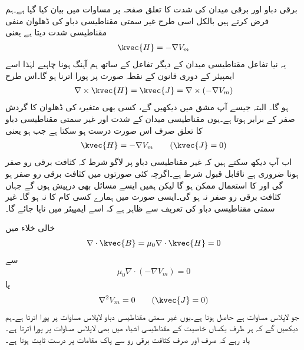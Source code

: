 برقی دباو اور برقی میدان کی شدت کا تعلق صفحہ  پر مساوات  میں بیان کیا گیا ہے۔ہم فرض کرتے ہیں  بالکل اسی طرح غیر سمتی مقناطیسی دباو  کی ڈھلوان منفی مقناطیسی شدت دیتا ہے یعنی
\begin{align*}
\kvec{H}=-\nabla V_m
\end{align*}
یہ نیا تفاعل مقناطیسی میدان کے دیگر تفاعل کے ساتھ ہم آہنگ ہونا چاہیے لہٰذا اسے ایمپیئر کے دوری قانون کے نقطہ صورت پر پورا اترنا ہو گا۔اس طرح
\begin{align}
\nabla \times \kvec{H}=\kvec{J}=\nabla \times \left(-\nabla V_m\right) 
\end{align}
ہو گا۔ البتہ جیسے آپ مشق  میں دیکھیں گے، کسی بھی متغیرہ کی ڈھلوان کا گردش صفر کے برابر ہوتا ہے۔یوں مقناطیسی میدان کے شدت اور غیر سمتی مقناطیسی دباو کا تعلق صرف اس صورت درست ہو سکتا ہے جب  ہو یعنی
\begin{align}\label{مساوات_مقناطیسی_شدت_غیر_سمتی_دباو}
\kvec{H}=-\nabla V_m \quad \quad (\kvec{J}=0)
\end{align}
اب آپ دیکھ سکتے ہیں کہ غیر مقناطیسی دباو پر لاگو شرط کہ کثافت برقی رو صفر ہونا ضروری ہے ناقابل قبول شرط ہے۔اگرچہ کئی صورتوں میں کثافت برقی رو صفر ہو گی اور  کا استعمال ممکن ہو گا لیکن ہمیں ایسے مسائل بھی درپیش ہوں  گے جہاں کثافت برقی رو صفر نہ ہو گی۔ایسی صورت میں  ہمارے کسی کام کا نہ ہو گا۔ غیر سمتی مقناطیسی دباو  کی تعریف سے ظاہر ہے کہ اسے ایمپیئر میں ناپا جائے گا۔

خالی خلاء میں
\begin{align*}
\nabla \cdot \kvec{B}=\mu_0 \nabla \cdot \kvec{H}=0
\end{align*}
سے
\begin{align*}
\mu_0 \nabla \cdot \left(-\nabla V_m \right)=0
\end{align*}
یا
\begin{align}
\nabla^2 V_m=0 \quad \quad (\kvec{J}=0)
\end{align}
جو لاپلاس مساوات ہے حاصل ہوتا ہے۔یوں غیر سمتی مقناطیسی دباو لاپلاس مساوات پر پورا اترتا ہے۔ہم دیکھیں گے کہ ہر طرف یکساں خاصیت کے مقناطیسی اشیاء میں بھی  لاپلاس مساوات پر پورا اترتا ہے۔یاد رہے کہ  صرف اور صرف کثافت برقی رو سے پاک مقامات پر درست ثابت ہوتا ہے۔

